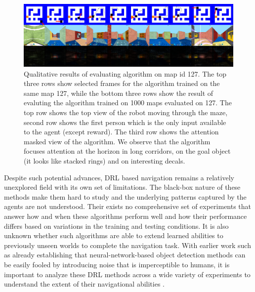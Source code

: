 \begin{figure}
\includegraphics[width=\textwidth]{./exp-results/training-09x09-0127-on-0127.png}%
\caption{Qualitative results of evaluating algorithm on map id 127. The top three rows show selected frames for the algorithm trained on the same map 127, while the bottom three rows show the result of evaluting the algorithm trained on 1000 maps evaluated on 127. The top row shows the top view of the robot moving through the maze, second row shows the first person which is the only input available to the agent (except reward). The third row shows the attention masked view of the algorithm. We observe that the algorithm focuses attention at the horizon in long corridors, on the goal object (it looks like stacked rings) and on interesting decals.}
\label{fig:training-qualitative}
\end{figure}

Despite such potential advances, DRL based navigation remains a relatively unexplored field with its own set of limitations. 
The black-box nature of these methods make them hard to study and the underlying patterns captured by the agents are not understood. 
Their exists no comprehensive set of experiments that answer how and when these algorithms perform well and how their performance differs based on variations in the training and testing conditions. 
It is also unknown whether such algorithms are able to extend learned abilities to previously unseen worlds to complete the navigation task.
With earlier work such as \cite{NgYoClCVPR2015} already establishing that  neural-network-based object detection methods can be easily fooled by introducing noise that is imperceptible to humans, it is important to analyze these DRL methods across a wide variety of experiments to understand the extent of their navigational abilities \cite{MiPaViICLR2017}.

